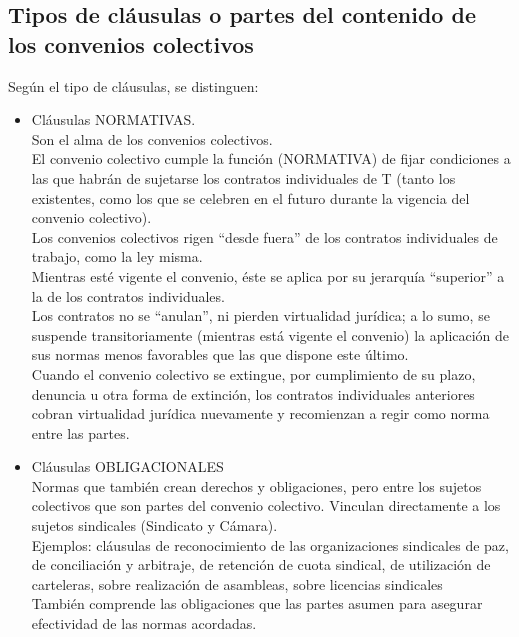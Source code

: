 \documentclass[spanish,12pt,a4paper,titlepage]{report}
\begin{document}
\subsection{Tipos de cláusulas o partes del contenido de los convenios colectivos}
Según el tipo de cláusulas, se distinguen:
\begin{itemize}
	\item Cláusulas NORMATIVAS.\\
	Son el alma de los convenios colectivos.\\
	El convenio colectivo cumple la función (NORMATIVA) de fijar condiciones a las que habrán de sujetarse los contratos individuales de T (tanto los existentes, como los que se celebren en el futuro durante la vigencia del convenio colectivo).\\
	Los convenios colectivos rigen “desde fuera” de los contratos individuales de trabajo, como la ley misma.\\
	Mientras esté vigente el convenio, éste se aplica por su jerarquía “superior” a la de los contratos individuales.\\
	
	Los contratos no se “anulan”, ni pierden virtualidad jurídica; a lo sumo, se suspende transitoriamente (mientras está vigente el convenio) la aplicación de sus normas menos favorables que las que dispone este último.\\ Cuando el convenio colectivo se extingue, por cumplimiento de su plazo, denuncia u otra forma de extinción, los contratos individuales anteriores cobran virtualidad jurídica nuevamente y recomienzan a regir como norma entre las partes.
	\item Cláusulas OBLIGACIONALES\\
	Normas que también crean derechos y obligaciones, pero entre los sujetos colectivos que son partes del convenio colectivo. Vinculan directamente a los sujetos sindicales (Sindicato y Cámara).\\
	Ejemplos: cláusulas de reconocimiento de las organizaciones sindicales de paz, de conciliación y arbitraje, de retención de cuota sindical, de utilización de carteleras, sobre realización de asambleas, sobre licencias sindicales\\
	También comprende las obligaciones que las partes asumen para asegurar efectividad de las normas acordadas.\\
	

\end{itemize}
\end{document}
